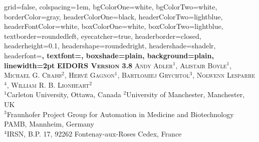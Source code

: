 \documentclass[portrait,final,a0paper,fontscale=0.277]{baposter}
\begin{document}


\begin{poster}%
  {
  grid=false,
  colspacing=1em,
  bgColorOne=white,
  bgColorTwo=white,
  borderColor=gray,
  headerColorOne=black,
  headerColorTwo=lightblue,
  headerFontColor=white,
  boxColorOne=white,
  boxColorTwo=lightblue,
  textborder=roundedleft,
  eyecatcher=true,
  headerborder=closed,
  headerheight=0.1\textheight,
  headershape=roundedright,
  headershade=shadelr,
  headerfont=\Large\bf\textsc, %
  textfont={\setlength{\parindent}{1.5em}},
  boxshade=plain,
  background=plain,
  linewidth=2pt
  }
  {
  }
  {\bf\textsc{EIDORS Version 3.8}}
  {\large \textsc{Andy Adler$^1$, Alistair Boyle$^1$, Michael G. Crabb$^2$,
     Herv\'e Gagnon$^1$, Bartłomiej Grychtol$^3$,
     Nolwenn Lesparre$^4$, William R. B. Lionheart$^2$}\\
    \small
    $^1$Carleton University, Ottawa, Canada \;\;\;\;
    $^2$University of Manchester, Manchester, UK\\
    $^3$Fraunhofer Project Group for Automation in Medicine and Biotechnology PAMB, Mannheim, Germany\\
    $^4$IRSN, B.P. 17, 92262 Fontenay-aux-Roses Cedex, France
  }
  {%
  }

    \newcommand{\colouredcircle}{%
      \tikz{\useasboundingbox (-0.2em,-0.32em) rectangle(0.2em,0.32em); \draw[draw=black,fill=lightblue,line width=0.03em] (0,0) circle(0.18em);}}


\end{poster}
\end{document}
